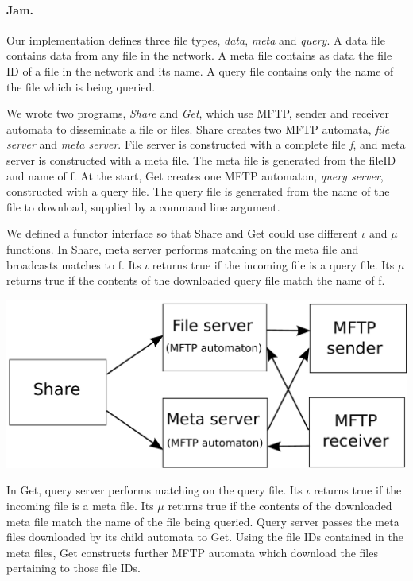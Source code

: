 \documentclass[letterpaper]{article}
\begin{document}
\paragraph{Jam.} %
Our implementation defines three file types, \emph{data}, \emph{meta} and \emph{query}.  
A data file contains data from any file in the network.
A meta file contains as data the file ID of a file in the network and its name. 
A query file contains only the name of the file which is being queried.

We wrote two programs, \emph{Share} and \emph{Get}, which use MFTP, sender and receiver automata to disseminate a file or files. %
Share creates two MFTP automata, \emph{file server} and \emph{meta server}.
File server is constructed with a complete file \emph{f}, and meta server is constructed with a meta file.
The meta file is generated from the fileID and name of f.
At the start, Get creates one MFTP automaton, \emph{query server}, constructed with a query file.
The query file is generated from the name of the file to download, supplied by a command line argument.

We defined a functor interface so that Share and Get could use different $\iota$ and $\mu$ functions.
In Share, meta server performs matching on the meta file and broadcasts matches to f.
Its $\iota$ returns true if the incoming file is a query file.
Its $\mu$ returns true if the contents of the downloaded query file match the name of f.

\vspace{2 mm}

\includegraphics[scale=0.55]{share_diagram}

\vspace{2 mm}

In Get, query server performs matching on the query file.
Its $\iota$ returns true if the incoming file is a meta file.
Its $\mu$ returns true if the contents of the downloaded meta file match the name of the file being queried.
Query server passes the meta files downloaded by its child automata to Get.
Using the file IDs contained in the meta files, Get constructs further MFTP automata which download the files pertaining to those file IDs.
\end{document}
